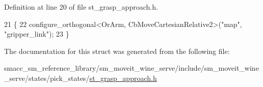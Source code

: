 Definition at line 20 of file st\+\_\+grasp\+\_\+approach.\+h.


\begin{DoxyCode}
21             \{
22                 configure\_orthogonal<OrArm, CbMoveCartesianRelative2>(\textcolor{stringliteral}{"map"}, \textcolor{stringliteral}{"gripper\_link"});
23             \}
\end{DoxyCode}


The documentation for this struct was generated from the following file\+:\begin{DoxyCompactItemize}
\item 
smacc\+\_\+sm\+\_\+reference\+\_\+library/sm\+\_\+moveit\+\_\+wine\+\_\+serve/include/sm\+\_\+moveit\+\_\+wine\+\_\+serve/states/pick\+\_\+states/\hyperlink{sm__moveit__wine__serve_2include_2sm__moveit__wine__serve_2states_2pick__states_2st__grasp__approach_8h}{st\+\_\+grasp\+\_\+approach.\+h}\end{DoxyCompactItemize}
